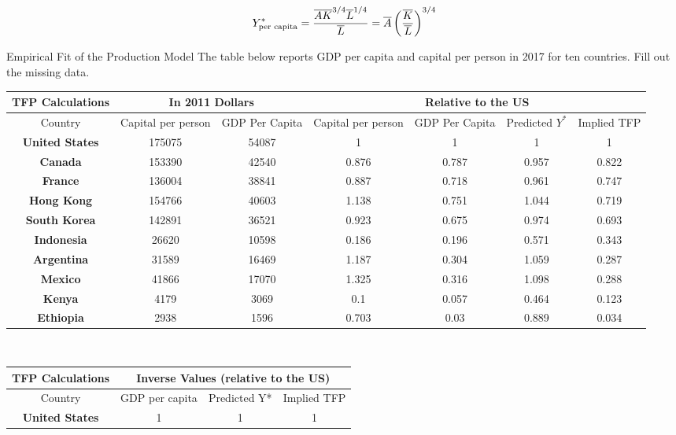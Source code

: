 \documentclass[8pt]{extarticle}
\begin{document}
    \[
      Y^{*}_{\tiny \textrm{per capita}} = \frac{\overline{A}\overline{K}^{3/4}\overline{L}^{1/4}}{\overline{L}} = \overline{A}\left(\frac{\overline{K}}{\overline{L}}\right)^{3/4}
    \]
\begin{mathbox}{Empirical Fit of the Production Model}
  The table below reports GDP per capita and capital per person in 2017 for ten countries. Fill out the missing data.      
\end{mathbox}
  \begin{center}
    \small
    \renewcommand{\arraystretch}{1.5}
    \begin{tabular}{c|cccccc}
      TFP Calculations & \multicolumn{2}{c}{In 2011 Dollars} & \multicolumn{4}{c}{Relative to the US} \\ \hline
      Country & Capital per person & GDP Per Capita & Capital per person & GDP Per Capita & Predicted $Y^{*}$ & Implied TFP \\ 
        \textbf{United States} & 175075 & 54087 & 1 & 1 & 1 & 1 \\ 
        \textbf{Canada} & 153390 & 42540 & 0.876 & 0.787 & 0.957 & 0.822 \\ 
        \textbf{France} & 136004 & 38841 & 0.887 & 0.718 & 0.961 & 0.747 \\ 
        \textbf{Hong Kong} & 154766 & 40603 & 1.138 & 0.751 & 1.044 & 0.719 \\ 
        \textbf{South Korea} & 142891 & 36521 & 0.923 & 0.675 & 0.974 & 0.693 \\ 
        \textbf{Indonesia} & 26620 & 10598 & 0.186 & 0.196 & 0.571 & 0.343 \\ 
        \textbf{Argentina} & 31589 & 16469 & 1.187 & 0.304 & 1.059 & 0.287 \\ 
        \textbf{Mexico} & 41866 & 17070 & 1.325 & 0.316 & 1.098 & 0.288 \\ 
        \textbf{Kenya} & 4179 & 3069 & 0.1 & 0.057 & 0.464 & 0.123 \\ 
        \textbf{Ethiopia} & 2938 & 1596 & 0.703 & 0.03 & 0.889 & 0.034 \\ \hline
    \end{tabular} \\
    \begin{tabular}{c|ccc}
        TFP Calculations & \multicolumn{3}{c}{Inverse Values (relative to the US)} \\ \hline
        Country & GDP per capita & Predicted Y* & Implied TFP \\ 
        \textbf{United States} & 1 & 1 & 1 \\ 

\end{tabular}
\end{center}
\end{document}
